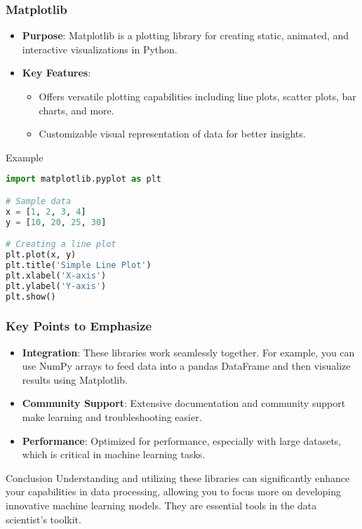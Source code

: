 \documentclass{beamer}
\begin{document}
\begin{frame}[fragile]
    \frametitle{Matplotlib}
    \begin{itemize}
        \item \textbf{Purpose}: Matplotlib is a plotting library for creating static, animated, and interactive visualizations in Python.
        \item \textbf{Key Features}:
        \begin{itemize}
            \item Offers versatile plotting capabilities including line plots, scatter plots, bar charts, and more.
            \item Customizable visual representation of data for better insights.
        \end{itemize}
    \end{itemize}
    
    \begin{block}{Example}
        \begin{lstlisting}[language=Python]
import matplotlib.pyplot as plt

# Sample data
x = [1, 2, 3, 4]
y = [10, 20, 25, 30]

# Creating a line plot
plt.plot(x, y)
plt.title('Simple Line Plot')
plt.xlabel('X-axis')
plt.ylabel('Y-axis')
plt.show()
        \end{lstlisting}
    \end{block}
\end{frame}

\begin{frame}
    \frametitle{Key Points to Emphasize}
    \begin{itemize}
        \item \textbf{Integration}: These libraries work seamlessly together. For example, you can use NumPy arrays to feed data into a pandas DataFrame and then visualize results using Matplotlib.
        \item \textbf{Community Support}: Extensive documentation and community support make learning and troubleshooting easier.
        \item \textbf{Performance}: Optimized for performance, especially with large datasets, which is critical in machine learning tasks.
    \end{itemize}
    
    \begin{block}{Conclusion}
        Understanding and utilizing these libraries can significantly enhance your capabilities in data processing, allowing you to focus more on developing innovative machine learning models. They are essential tools in the data scientist's toolkit.
    \end{block}
\end{frame}
\end{document}
